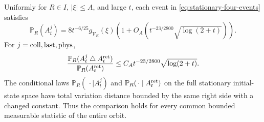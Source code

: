 \begin{theorem}
\label{thm:stationary-physical-windows}
Uniformly for $R\in I$, $|\xi|\le A$, and large $t$, each event in
\eqref{eq:stationary-four-events} satisfies
\begin{equation}\label{eq:stationary-window-denominator}
 \mathbb P_R(A_t^j)=8t^{-6/25}g_{\mathcal V_R}(\xi)
            \left(1+O_A(t^{-23/2800}\sqrt{\log(2+t)})\right).
\end{equation}
For $j={\rm coll},{\rm last},{\rm phys}$,
\begin{equation}\label{eq:stationary-relative-event-bound}
 \frac{\mathbb P_R(A_t^j\mathbin\triangle A_t^{\rm ret})}
                 {\mathbb P_R(A_t^{\rm ret})}
 \le C_A t^{-23/2800}\sqrt{\log(2+t)}.
\end{equation}
The conditional laws $\mathbb P_R(\,\cdot\mid A_t^j)$ and
$\mathbb P_R(\,\cdot\mid A_t^{\rm ret})$ on the full stationary
initial-state space have total variation distance bounded by the
same right side with a changed constant. Thus the comparison holds
for every common bounded measurable statistic of the entire orbit.
\end{theorem}
